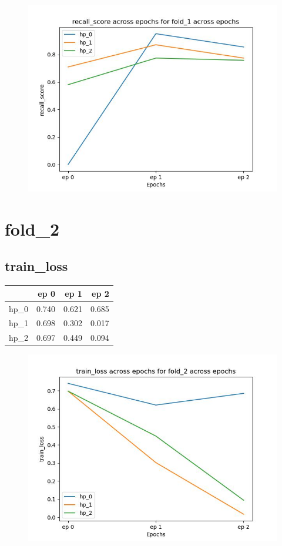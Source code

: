 \documentclass{article}
\begin{document}
\begin{figure}[H]
\includegraphics[scale = 0.75]{fold_1/recall_score}
\end{figure}
\section{fold\_2}
\subsection{train\_loss}
\begin{tabular}{lrrr}
\toprule
{} &   ep 0 &   ep 1 &   ep 2 \\
\midrule
hp\_0 &  0.740 &  0.621 &  0.685 \\
hp\_1 &  0.698 &  0.302 &  0.017 \\
hp\_2 &  0.697 &  0.449 &  0.094 \\
\bottomrule
\end{tabular}

\begin{figure}[H]
\includegraphics[scale = 0.75]{fold_2/train_loss}
\end{figure}
\end{document}
